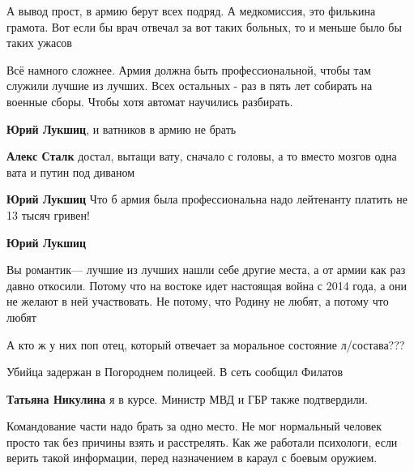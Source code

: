  
 
 
 
 
\zzSecCmt

\begin{itemize} %

А вывод прост, в армию берут всех подряд. А медкомиссия, это филькина грамота.
Вот если бы врач отвечал за вот таких больных, то и меньше было бы таких ужасов

\begin{itemize} %

Всё намного сложнее. Армия должна быть профессиональной, чтобы там служили
лучшие из лучших. Всех остальных - раз в пять лет собирать на военные сборы.
Чтобы хотя автомат научились разбирать.


\textbf{Юрий Лукшиц}, и ватников в армию не брать

\textbf{Алекс Сталк} достал, вытащи вату, сначало с головы, а то вместо мозгов одна вата и путин под диваном

\textbf{Юрий Лукшиц} Что б армия была профессиональна надо лейтенанту платить не 13 тысяч гривен!

\textbf{Юрий Лукшиц}

Вы романтик— лучшие из лучших нашли себе другие места, а от армии как раз давно
откосили. Потому что на востоке идет настоящая война с 2014 года, а они не
желают в ней участвовать. Не потому, что Родину не любят, а потому что любят


А кто ж у них поп отец, который отвечает за моральное состояние л/состава???
\end{itemize} %

Убийца задержан в Погороднем полицеей. В сеть сообщил Филатов

\textbf{Татьяна Никулина} я в курсе. Министр МВД и ГБР также подтвердили.


Командование части надо брать за одно место. Не мог нормальный человек просто
так без причины взять и расстрелять. Как же работали психологи, если верить
такой информации, перед назначением в караул с боевым оружием.



\end{itemize}
